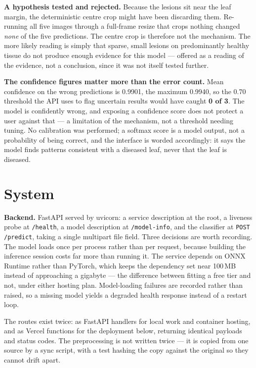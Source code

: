 \documentclass[10pt,a4paper]{article}
\begin{document}
\textbf{A hypothesis tested and rejected.} Because the lesions sit near the leaf margin,
the deterministic centre crop might have been discarding them. Re-running all five
images through a full-frame resize that crops nothing changed \emph{none} of the five
predictions. The centre crop is therefore not the mechanism. The more likely reading is
simply that sparse, small lesions on predominantly healthy tissue do not produce enough
evidence for this model --- offered as a reading of the evidence, not a conclusion, since
it was not itself tested further.

\textbf{The confidence figures matter more than the error count.} Mean confidence on the
wrong predictions is 0.9901, the maximum 0.9940, so the 0.70 threshold the API uses to
flag uncertain results would have caught \textbf{0 of 3}. The model is confidently wrong,
and exposing a confidence score does not protect a user against that --- a limitation of
the mechanism, not a threshold needing tuning. No calibration was performed; a softmax
score is a model output, not a probability of being correct, and the interface is worded
accordingly: it says the model finds patterns consistent with a diseased leaf, never that
the leaf is diseased.

\section{System}

\textbf{Backend.} FastAPI served by uvicorn: a service description at the root, a
liveness probe at \texttt{/health}, a model description at \texttt{/model-info}, and the
classifier at \texttt{POST /predict}, taking a single multipart file field. Three
decisions are worth recording. The model loads once per process rather than per request,
because building the inference session costs far more than running it. The service
depends on ONNX Runtime rather than PyTorch, which keeps the dependency set near 100\,MB
instead of approaching a gigabyte --- the difference between fitting a free tier and not,
under either hosting plan. Model-loading failures are recorded rather than raised, so a
missing model yields a degraded health response instead of a restart loop.

The routes exist twice: as FastAPI handlers for local work and container hosting, and as
Vercel functions for the deployment below, returning identical payloads and status
codes. The preprocessing is not written twice --- it is copied from one source by a sync
script, with a test hashing the copy against the original so they cannot drift apart.
\end{document}
